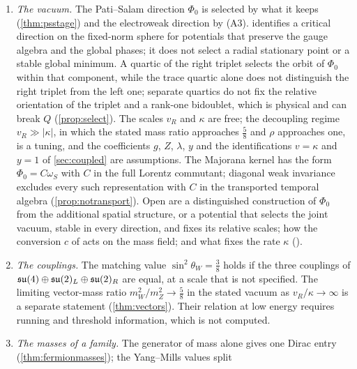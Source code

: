 \begin{enumerate}[leftmargin=2em,itemsep=4pt]
it assumes; at the second rung the direct product permits independent gauge couplings. Open are whether the split form of \cref{ch:curl},
with its additional modes, and the density of \cref{prop:BP}, which has both branches, have a role in the coupled theory; whether the clock
angle $\theta$ is a field of the completed theory, which would need a coupling that \cref{eq:Lcomp} does not contain; and everything beyond
tree level.
\item \emph{The vacuum.} The Pati--Salam direction $\Phi_0$ is selected by what it keeps (\cref{thm:psstage}) and the electroweak direction by
(A3).  identifies a critical direction on the fixed-norm sphere for potentials that preserve the gauge algebra and the global
phases; it does not select a radial stationary point or a stable global minimum. A quartic of the right triplet selects the orbit of
$\Phi_0$ within that component, while the trace quartic alone does not distinguish the right triplet from the left one; separate quartics do
not fix the relative orientation of the triplet and a rank-one bidoublet, which is physical and can break $Q$ (\cref{prop:select}). The
scales $v_R$ and $\kappa$ are free; the decoupling regime $v_R\gg|\kappa|$, in which the stated mass ratio approaches $\tfrac58$ and $\rho$
approaches one, is a tuning, and the coefficients $g$, $Z$, $\lambda$, $y$ and
the identifications $v=\kappa$ and $y=1$ of \cref{sec:coupled} are assumptions. The Majorana kernel has the form $\Phi_0=C\omega_S$ with $C$ in the full
Lorentz commutant; diagonal weak invariance excludes every such representation with $C$ in the transported temporal algebra
(\cref{prop:notransport}). Open are a distinguished construction of $\Phi_0$ from the additional spatial structure, or a potential that
selects the joint vacuum, stable in every direction, and fixes its relative scales; how the conversion $c$ of  acts on the
mass field; and what fixes the rate $\kappa$ ().
\item \emph{The couplings.} The matching value $\sin^2\theta_W=\tfrac38$ holds if the three couplings of $\mathfrak{su}(4)\oplus\mathfrak{su}(2)_L\oplus\mathfrak{su}(2)_R$ are
equal, at a scale that is not specified. The limiting vector-mass ratio $m_W^2/m_Z^2\to\tfrac58$ in the stated vacuum as $v_R/\kappa\to\infty$
is a separate statement (\cref{thm:vectors}). Their relation at low energy requires running and threshold information, which is not
computed.
\item \emph{The masses of a family.} The generator of mass alone gives one Dirac entry (\cref{thm:fermionmasses}); the Yang--Mills values split

\end{enumerate}
